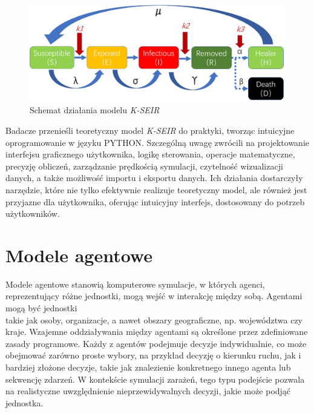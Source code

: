 \begin{figure}[h!]
	\includegraphics[width=\linewidth]{kseirscheme.png}
	\caption{Schemat działania modelu  \textit {K-SEIR}\cite{bib:artykul} }
\end{figure}

Badacze przenieśli teoretyczny model \textit {K-SEIR} do praktyki, tworząc intuicyjne oprogramowanie w języku PYTHON. Szczególną uwagę zwrócili na projektowanie interfejsu graficznego użytkownika, logikę sterowania, operacje matematyczne, precyzję obliczeń, zarządzanie prędkością symulacji, czytelność wizualizacji danych, a także możliwość importu i eksportu danych. Ich działania dostarczyły narzędzie, które nie tylko efektywnie realizuje teoretyczny model, ale również jest przyjazne dla użytkownika, oferując intuicyjny interfejs, dostosowany do potrzeb użytkowników.
\newpage
\section{\textbf{Modele agentowe}}

Modele agentowe stanowią komputerowe symulacje, w których agenci, reprezentujący różne jednostki, mogą wejść w interakcję między sobą. Agentami mogą być jednostki\\ takie jak osoby, organizacje, a nawet obszary geograficzne, np. województwa czy kraje. Wzajemne oddziaływania między agentami są określone przez zdefiniowane zasady programowe. Każdy z agentów podejmuje decyzje indywidualnie, co może obejmować zarówno proste wybory, na przykład decyzję o kierunku ruchu, jak i bardziej złożone decyzje, takie jak znalezienie konkretnego innego agenta lub sekwencję zdarzeń. W kontekście symulacji zarażeń, tego typu podejście pozwala na realistyczne uwzględnienie nieprzewidywalnych decyzji, jakie może podjąć jednostka.

